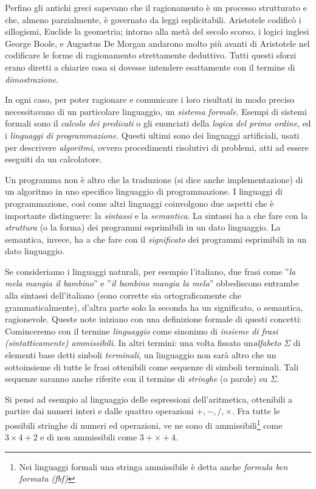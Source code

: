 Perfino gli antichi greci sapevano che il ragionamento è un processo strutturato e che, almeno parzialmente, è governato da leggi esplicitabili. Aristotele codificò i sillogismi, Euclide la geometria; intorno alla metà del secolo scorso, i logici inglesi George Boole, e Augustus De Morgan andarono molto più avanti di Aristotele nel codificare le forme di ragionamento strettamente deduttivo. Tutti questi sforzi erano diretti a chiarire cosa si dovesse intendere esattamente con il termine di \emph{dimostrazione}.

In ogni caso, per poter ragionare e comunicare i loro risultati in modo preciso necessitavano di un particolare linguaggio, un \emph{sistema formale}. Esempi di sistemi formali sono il \emph{calcolo dei predicati} o gli enunciati della \emph{logica del primo ordine}, ed i \emph{linguaggi di programmazione}. Questi ultimi sono dei linguaggi artificiali, usati per descrivere \emph{algoritmi}, ovvero procedimenti risolutivi di problemi, atti ad
essere eseguiti da un calcolatore.

Un programma non è altro che la traduzione (si dice anche implementazione) di un algoritmo in uno specifico linguaggio
di programmazione. I linguaggi di programmazione, così come altri linguaggi coinvolgono due aspetti che è importante distinguere: la \emph{sintassi} e la \emph{semantica}. La sintassi ha a che fare con la \emph{struttura} (o la forma) dei programmi esprimibili in un dato linguaggio. La semantica, invece, ha a che fare con il \emph{significato} dei programmi esprimibili in un dato linguaggio.

Se consideriamo i linguaggi naturali, per esempio l'italiano, due frasi come ''\emph{la mela mangia il bambino}'' e ''\emph{il bambino mangia la mela}'' obbediscono entrambe alla sintassi dell'italiano (sono corrette sia ortograficamente che grammaticalmente), d'altra parte solo la seconda ha un significato, o semantica, ragionevole. Queste note iniziano con una definizione formale di questi concetti: Cominceremo con il termine \emph{linguaggio} come sinonimo di \emph{insieme di frasi (sintatticamente) ammissibili}. In altri termini: una volta fissato un\emph{alfabeto} $\Sigma$ di elementi base detti sinboli \emph{terminali}, un linguaggio non sarà altro che un sottoinsieme di tutte le frasi ottenibili come sequenze di simboli terminali. Tali sequenze saranno anche riferite con il termine di \emph{stringhe} (o parole) su $\Sigma$.

Si pensi ad esempio al linguaggio delle espressioni dell'aritmetica, ottenibili a partire dai numeri interi e dalle quattro operazioni $+, -, /, \times$. Fra tutte le possibili stringhe di numeri ed operazioni, ve ne sono di ammissibili\footnote{Nei linguaggi formali una stringa ammissibile è detta anche \emph{formula ben formata (fbf)}} come $3 \times 4+2$ e di non ammissibili come $3+\times+4$.

